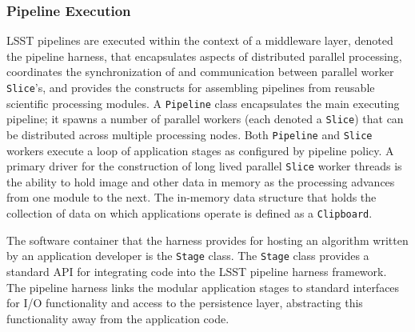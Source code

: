 
\subsubsection{Pipeline Execution} \label{sec:harness}

LSST pipelines are executed within the context of a middleware layer, denoted the
pipeline harness, that encapsulates aspects of distributed parallel
processing, coordinates the synchronization of and communication
between parallel worker {\tt Slice}'s,
and provides the constructs for assembling pipelines from
reusable scientific processing modules.
A {\tt Pipeline} class encapsulates the main executing pipeline;
it spawns a number of parallel workers (each denoted a {\tt Slice})
that can be distributed across multiple processing nodes. Both {\tt Pipeline}
and {\tt Slice} workers execute a loop of application stages
as configured by pipeline policy.
A primary driver for the construction of long lived parallel {\tt Slice}
worker threads is the ability to hold image and other data in memory
as the processing advances from one module to the next. The in-memory
data structure that holds the collection of data on which
applications operate is defined as a {\tt Clipboard}.

The software container that the harness provides for hosting an algorithm written
by an application developer is the {\tt Stage} class.
The {\tt Stage} class provides a standard API
for integrating code into the LSST pipeline harness framework.
The pipeline harness links the modular application stages to standard interfaces for
I/O functionality and access to the persistence layer, abstracting this functionality
away from the application code.


